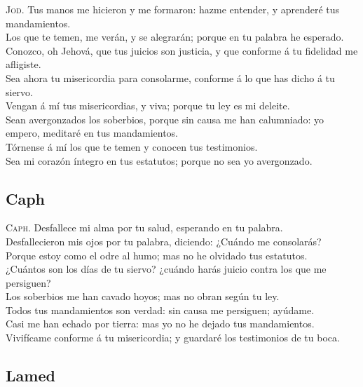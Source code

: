  \textsc{Jod}. Tus manos me hicieron y me formaron: hazme
entender, y aprenderé tus mandamientos.\\
 Los que te temen, me verán, y se alegrarán; porque en tu
palabra he esperado.\\
 Conozco, oh Jehová, que tus juicios son justicia, y que
conforme á tu fidelidad me afligiste.\\
 Sea ahora tu misericordia para consolarme, conforme á lo
que has dicho á tu siervo.\\
 Vengan á mí tus misericordias, y viva; porque tu ley es
mi deleite.\\
 Sean avergonzados los soberbios, porque sin causa me han
calumniado: yo empero, meditaré en tus mandamientos.\\
 Tórnense á mí los que te temen y conocen tus
testimonios.\\
 Sea mi corazón íntegro en tus estatutos; porque no sea
yo avergonzado.

\hypertarget{caph}{%
\subsection{Caph}\label{caph}}

 \textsc{Caph}. Desfallece mi alma por tu salud,
esperando en tu palabra.\\
 Desfallecieron mis ojos por tu palabra, diciendo:
¿Cuándo me consolarás?\\
 Porque estoy como el odre al humo; mas no he olvidado
tus estatutos.\\
 ¿Cuántos son los días de tu siervo? ¿cuándo harás juicio
contra los que me persiguen?\\
 Los soberbios me han cavado hoyos; mas no obran según tu
ley.\\
 Todos tus mandamientos son verdad: sin causa me
persiguen; ayúdame.\\
 Casi me han echado por tierra: mas yo no he dejado tus
mandamientos.\\
 Vivifícame conforme á tu misericordia; y guardaré los
testimonios de tu boca.

\hypertarget{lamed}{%
\subsection{Lamed}\label{lamed}}

